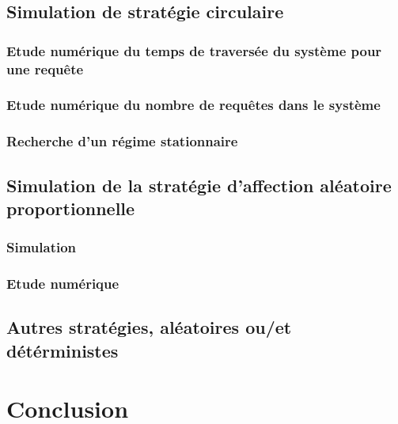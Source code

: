 \documentclass{article}
\begin{document}
\subsection{Simulation de stratégie circulaire}
\subsubsection{Etude numérique du temps de traversée du système pour une requête}
\subsubsection{Etude numérique du nombre de requêtes dans le système}
\subsubsection{Recherche d'un régime stationnaire}

\subsection{Simulation de la stratégie d'affection aléatoire proportionnelle}
\subsubsection{Simulation}
\subsubsection{Etude numérique}

\subsection{Autres stratégies, aléatoires ou/et détérministes}

\section{Conclusion}
\paragraph{}

\newpage
\appendix

\section{}

\subsection{}
\begin{verbatim}
\end{verbatim}
\end{document}
